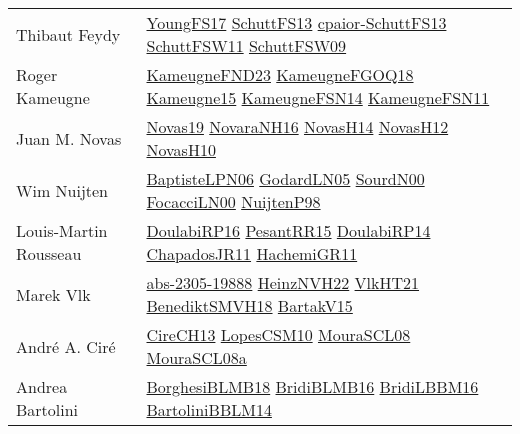 {\begin{longtable}{p{4cm}p{20cm}}
Thibaut Feydy & \href{papers/YoungFS17.pdf}{YoungFS17}\cite{YoungFS17} \href{papers/SchuttFS13.pdf}{SchuttFS13}\cite{SchuttFS13} \href{papers/cpaior-SchuttFS13.pdf}{cpaior-SchuttFS13}\cite{cpaior-SchuttFS13} \href{articles/SchuttFSW11.pdf}{SchuttFSW11}\cite{SchuttFSW11} \href{papers/SchuttFSW09.pdf}{SchuttFSW09}\cite{SchuttFSW09} \\
Roger Kameugne & \href{papers/KameugneFND23.pdf}{KameugneFND23}\cite{KameugneFND23} \href{papers/KameugneFGOQ18.pdf}{KameugneFGOQ18}\cite{KameugneFGOQ18} \href{articles/Kameugne15.pdf}{Kameugne15}\cite{Kameugne15} \href{articles/KameugneFSN14.pdf}{KameugneFSN14}\cite{KameugneFSN14} \href{papers/KameugneFSN11.pdf}{KameugneFSN11}\cite{KameugneFSN11} \\
Juan M. Novas & \href{articles/Novas19.pdf}{Novas19}\cite{Novas19} \href{articles/NovaraNH16.pdf}{NovaraNH16}\cite{NovaraNH16} \href{articles/NovasH14.pdf}{NovasH14}\cite{NovasH14} \href{articles/NovasH12.pdf}{NovasH12}\cite{NovasH12} \href{articles/NovasH10.pdf}{NovasH10}\cite{NovasH10} \\
Wim Nuijten & \href{}{BaptisteLPN06}\cite{BaptisteLPN06} \href{}{GodardLN05}\cite{GodardLN05} \href{}{SourdN00}\cite{SourdN00} \href{papers/FocacciLN00.pdf}{FocacciLN00}\cite{FocacciLN00} \href{articles/NuijtenP98.pdf}{NuijtenP98}\cite{NuijtenP98} \\
Louis{-}Martin Rousseau & \href{}{DoulabiRP16}\cite{DoulabiRP16} \href{papers/PesantRR15.pdf}{PesantRR15}\cite{PesantRR15} \href{papers/DoulabiRP14.pdf}{DoulabiRP14}\cite{DoulabiRP14} \href{papers/ChapadosJR11.pdf}{ChapadosJR11}\cite{ChapadosJR11} \href{articles/HachemiGR11.pdf}{HachemiGR11}\cite{HachemiGR11} \\
Marek Vlk & \href{articles/abs-2305-19888.pdf}{abs-2305-19888}\cite{abs-2305-19888} \href{articles/HeinzNVH22.pdf}{HeinzNVH22}\cite{HeinzNVH22} \href{articles/VlkHT21.pdf}{VlkHT21}\cite{VlkHT21} \href{papers/BenediktSMVH18.pdf}{BenediktSMVH18}\cite{BenediktSMVH18} \href{}{BartakV15}\cite{BartakV15} \\
Andr{\'{e}} A. Cir{\'{e}} & \href{papers/CireCH13.pdf}{CireCH13}\cite{CireCH13} \href{articles/LopesCSM10.pdf}{LopesCSM10}\cite{LopesCSM10} \href{papers/MouraSCL08.pdf}{MouraSCL08}\cite{MouraSCL08} \href{papers/MouraSCL08a.pdf}{MouraSCL08a}\cite{MouraSCL08a} \\
Andrea Bartolini & \href{articles/BorghesiBLMB18.pdf}{BorghesiBLMB18}\cite{BorghesiBLMB18} \href{articles/BridiBLMB16.pdf}{BridiBLMB16}\cite{BridiBLMB16} \href{papers/BridiLBBM16.pdf}{BridiLBBM16}\cite{BridiLBBM16} \href{papers/BartoliniBBLM14.pdf}{BartoliniBBLM14}\cite{BartoliniBBLM14} \\

\end{longtable}}
